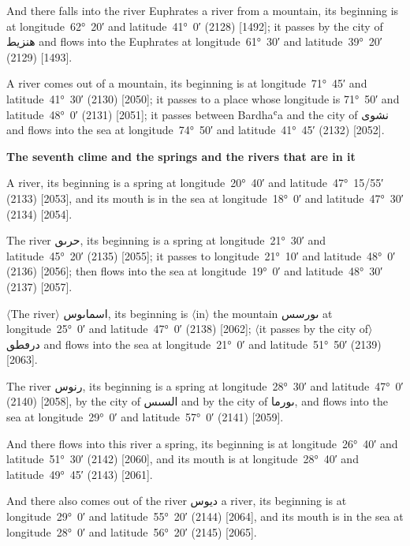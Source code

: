 \documentclass[11pt]{article}
\newcommand{\Pg}[1]{\marginpar{\footnotesize #1}}
\newcommand{\Ang}[1]{\ensuremath{#1}}
\begin{document}
And there falls into the river Euphrates a river from a mountain, its beginning is at longitude~62°~20′ and latitude~41°~0′ (2128) [1492]; it passes by the city of \textarabic{هنزيط} and flows into the Euphrates at longitude~61°~30′ and latitude~39°~20′ (2129) [1493].

\Pg{p. 141}A river comes out of a mountain, its beginning is at longitude~71°~45′ and latitude~41°~30′ (2130) [2050]; it passes to a place whose longitude is 71°~50′ and latitude~48°~0′ (2131) [2051]; it passes between Bardhaʿa and the city of \textarabic{نشوى} and flows into the sea at longitude~74°~50′ and latitude~41°~45′ (2132) [2052].

\par\medskip\begin{center}\bfseries The seventh clime and the springs and the rivers that are in it\end{center}\par

A river, its beginning is a spring at longitude~20°~40′ and latitude~47°~15/55′ (2133) [2053], and its mouth is in the sea at longitude~18°~0′ and latitude~47°~30′ (2134) [2054].

The river \textarabic{حرٮٯ}, its beginning is a spring at longitude~21°~30′ and latitude~45°~20′ (2135) [2055]; it passes to longitude~21°~10′ and latitude~48°~0′ (2136) [2056]; then flows into the sea at longitude~19°~0′ and latitude~48°~30′ (2137) [2057].

\Ang{\langle}The river\Ang{\rangle} \textarabic{اسماٮوس}, its beginning is \Ang{\langle}in\Ang{\rangle} the mountain \textarabic{ٮورسس} at longitude~25°~0′ and latitude~47°~0′ (2138) [2062]; \Ang{\langle}it passes by the city of\Ang{\rangle} \textarabic{درڡطٯ} and flows into the sea at longitude~21°~0′ and latitude~51°~50′ (2139) [2063].

The river \textarabic{رنوس}, its beginning is a spring at longitude~28°~30′ and latitude~47°~0′ (2140) [2058], by the city of \textarabic{السٮس} and by the city of \textarabic{ٮورما}, and flows into the sea at longitude~29°~0′ and latitude~57°~0′ (2141) [2059]\Pg{p. 142}.

And there flows into this river a spring, its beginning is at longitude~26°~40′ and latitude~51°~30′ (2142) [2060], and its mouth is at longitude~28°~40′ and latitude~49°~45′ (2143) [2061].

And there also comes out of the river \textarabic{ديوس} a river, its beginning is at longitude~29°~0′ and latitude~55°~20′ (2144) [2064], and its mouth is in the sea at longitude~28°~0′ and latitude~56°~20′ (2145) [2065].
\end{document}
